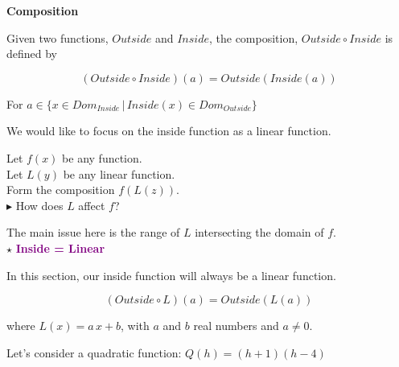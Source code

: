 \documentclass{ximera}
\begin{document}
\begin{definition} \textbf{\textcolor{green!50!black}{Composition}}  


Given two functions, $Outside$ and $Inside$, the composition, $Outside \circ Inside$ is defined by

\[      (Outside \circ Inside)(a) = Outside(Inside(a))        \]

For $ a \in \{  x \in Dom_{Inside} \, | \,    Inside(x) \in Dom_{Outside}  \}$

\end{definition}

We would like to focus on the inside function as a linear function.




Let $f(x)$ be any function. \\
Let $L(y)$ be any linear function. \\


Form the composition $f(L(z))$. \\

$\blacktriangleright$ How does $L$ affect $f$?




The main issue here is the range of $L$ intersecting the domain of $f$. \\











$\star$ \textbf{\textcolor{purple}{Inside = Linear}}


In this section, our inside function will always be a linear function.



\[      (Outside \circ L)(a) = Outside(L(a))        \]


where $L(x) = a \, x + b$, with $a$ and $b$ real numbers and $a \ne 0$.



Let's consider a quadratic function: $Q(h) = (h+1)(h-4)$
\end{document}
